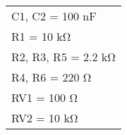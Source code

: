 \documentclass{../../kicad/kicad}
\begin{document}
\begin{center}
~\\
~\\
~\\
~\\
\begin{tabular}{l}
C1, C2 = 100 \si{\nano\farad}\\
R1 = 10 \si{\kilo\ohm}\\
R2, R3, R5 = 2.2 \si{\kilo\ohm}\\
R4, R6 = 220 \si{\ohm}\\
RV1 = 100 \si{\ohm}\\
RV2 = 10 \si{\kilo\ohm}
\end{tabular}\\
~\\
~\\
\end{center}
\end{document}
